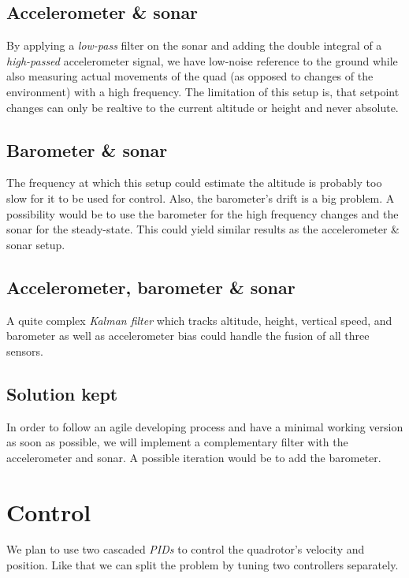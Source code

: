 \documentclass{repMobRob}
\begin{document}
\subsection{Accelerometer \& sonar}
By applying a \emph{low-pass} filter on the sonar and adding the double integral of a \emph{high-passed} accelerometer signal, we have low-noise reference to the ground while also measuring actual movements of the quad (as opposed to changes of the environment) with a high frequency.
The limitation of this setup is, that setpoint changes can only be realtive to the current altitude or height and never absolute.

\subsection{Barometer \& sonar}
The frequency at which this setup could estimate the altitude is probably too slow for it to be used for control.
Also, the barometer's drift is a big problem.
A possibility would be to use the barometer for the high frequency changes and the sonar for the steady-state.
This could yield similar results as the accelerometer \& sonar setup.

\subsection{Accelerometer, barometer \& sonar}
A quite complex \emph{Kalman filter} which tracks altitude, height, vertical speed, and barometer as well as accelerometer bias could handle the fusion of all three sensors.

\subsection{Solution kept}
In order to follow an agile developing process and have a minimal working version as soon as possible, we will implement a complementary filter with the accelerometer and sonar.
A possible iteration would be to add the barometer.

\section{Control}
We plan to use two cascaded \emph{PIDs} to control the quadrotor's velocity and position. Like that we can split the problem by tuning two controllers separately.
\end{document}

